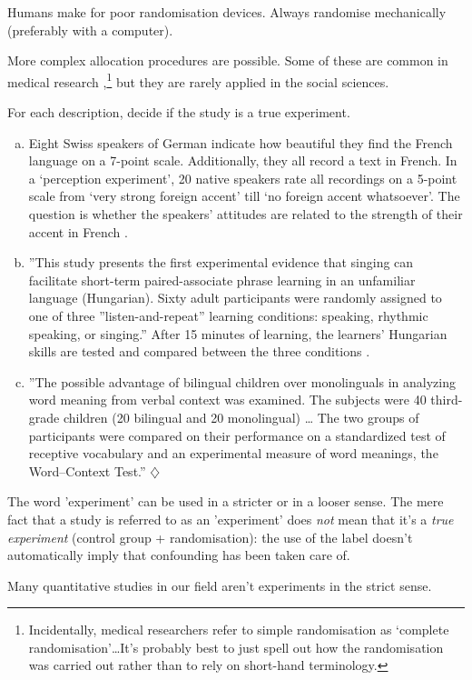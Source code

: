 \documentclass[a4paper]{tufte-book}\usepackage[]{graphicx}\usepackage[]{xcolor}
\newcommand*{\parend}[1][$\diamondsuit$]{%
\leavevmode\unskip\penalty9999 \hbox{}\nobreak\hfill
    \quad\hbox{#1}%
}
\begin{document}
\begin{framed}
 Humans make for poor randomisation devices.
 Always randomise mechanically (preferably with a computer).
\end{framed}

More complex allocation procedures are possible.
Some of these are common in medical research \citep{Rosenberger2016},\footnote{Incidentally, medical researchers refer to simple randomisation as `complete randomisation'\dots It's probably best to just spell out how the randomisation was carried out rather than to rely on short-hand terminology.} 
but they are rarely applied in the social sciences.

For each description, decide if the study is a true experiment.

\begin{enumerate}[(a)]

 \item Eight Swiss speakers of German indicate how beautiful they find
 the French language on a 7-point scale. Additionally, they all record a text in French.
 In a `perception experiment', 20 native speakers rate all recordings on a 5-point scale
 from `very strong foreign accent' till `no foreign accent whatsoever'.
 The question is whether the speakers' attitudes are related to the strength of their accent in French \citep{Kolly2011}.

 \item ''This study presents the first experimental evidence that singing can facilitate short-term paired-associate phrase learning in an unfamiliar language (Hungarian). Sixty adult participants were randomly assigned to one of three ''listen-and-repeat'' learning conditions: speaking, rhythmic speaking, or singing.''
 After 15 minutes of learning, the learners' Hungarian skills are tested and compared between the three conditions \citep{Ludke2014}.

 \item ''The possible advantage of bilingual children over monolinguals in analyzing word meaning from verbal context was examined.
 The subjects were 40 third-grade children (20 bilingual and 20 monolingual) \dots
 The two groups of participants were compared on their performance on a standardized test of receptive vocabulary
 and an experimental measure of word meanings, the Word--Context Test.'' \citep{MarinovaTodd2012}\parend
\end{enumerate}

\begin{framed}
 The word 'experiment' can be used in a stricter or in a looser sense.
The mere fact that a study is referred to as an 'experiment' does \emph{not}
mean that it's a \textit{true experiment} (control group + randomisation):
the use of the label doesn't automatically imply that confounding has been
taken care of.

 Many quantitative studies in our field aren't experiments in the strict sense.
\end{framed}
\end{document}
